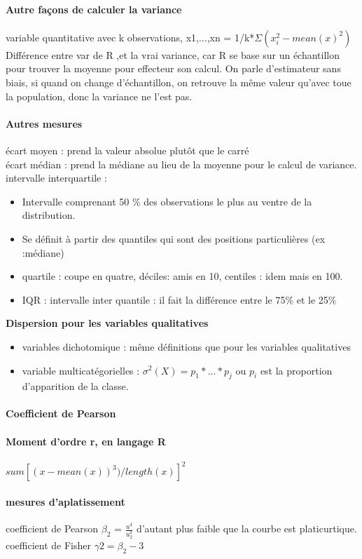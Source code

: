 \documentclass{article}
\begin{document}
\paragraph{Autre façons de calculer la variance} variable quantitative avec k observations, x1,...,xn = 1/k*$\Sigma (x_{i}^{2}-mean(x)^{2})$
Différence entre var de R ,et la vrai variance, car R se base sur un échantillon pour trouver la moyenne pour effecteur son calcul. On parle d'estimateur sans biais, si quand on change d'échantillon, on retrouve la même valeur qu'avec toue la population, donc la variance ne l'est pas.
\paragraph{Autres mesures}
écart moyen : prend la valeur absolue plutôt que le carré\\
écart médian : prend la médiane au lieu de la moyenne pour le calcul de variance.
intervalle interquartile : \begin{itemize}
\item Intervalle comprenant 50 \% des observations le plus au ventre de la distribution.
\item Se définit à partir des quantiles qui sont des positions particulières (ex :médiane)
\item quartile : coupe en quatre, déciles:  amis en 10, centiles : idem mais en 100.
\item IQR : intervalle inter quantile : il fait la différence entre le 75\% et le 25\%
\end{itemize}
\textbf{Dispersion pour les variables qualitatives}
\begin{itemize}
\item variables dichotomique : même définitions que pour les variables qualitatives
\item variable multicatégorielles : $\sigma^{2}(X) = p_{1}*...*p_{j}$ ou $p_{i}$ est la proportion d'apparition de la classe.
\end{itemize}


\paragraph{Coefficient de Pearson}
\date{13 février 2013}
\paragraph{Moment d'ordre r, en langage R} $sum[(x-mean(x))^{3})/length(x)]^2$ 
\paragraph{mesures d'aplatissement}
coefficient de Pearson $\beta_{2}$ = $\frac{u^{4}}{u_{2}^{2}}$ d’autant plus faible que la courbe est platicurtique.\\coefficient de Fisher $\gamma{2}=\beta_{2}-3$
\end{document}
